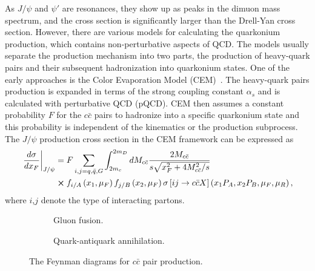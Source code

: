 \documentclass[../main.tex]{subfiles}
\begin{document}
As $J/\psi$ and $\psi'$ are resonances, they show up as peaks in the dimuon mass spectrum,
and the cross section is significantly larger than the Drell-Yan cross section.
However, there are various models for calculating the quarkonium production,
which contains non-perturbative aspects of QCD.
The models usually separate the production
mechanism into two parts, the production of heavy-quark pairs and their subsequent
hadronization into quarkonium states. One of the early approaches is the Color
Evaporation Model (CEM)~\cite{einhorn1975,bodwin1995}. The heavy-quark
pairs production is expanded in terms of the strong coupling constant $\alpha_s$
and is calculated with perturbative QCD (pQCD). CEM then assumes a constant
probability $F$ for the $c\bar{c}$ pairs to hadronize into a specific quarkonium
state and this probability is independent of the kinematics or the production
subprocess. The $J/\psi$ production cross section in the CEM framework can be
expressed as
\begin{equation}
	\begin{split}
		\left.\frac{d\sigma}{dx_F}\right|_{J/\psi} & = F \sum_{i,j = q,\bar{q},G}\int^{2m_D}_{2m_c} dM_{c\bar{c}}  \frac{2M_{c\bar{c}}}{s\sqrt{x_F^2+4M_{c\bar{c}}^2/s}}                                 \\
		                                           & \cross f_{i/A}\left(x_1,\mu_F\right)f_{j/B}\left(x_2,\mu_F\right)\sigma\left[ij\rightarrow c\bar{c}X\right]\left(x_1P_A,x_2P_B,\mu_F,\mu_R \right),
	\end{split}
\end{equation}
where $i$,$j$ denote the type of interacting partons.
\begin{figure}[htpb!]
	\centering
	\begin{subfigure}[c]{0.4\linewidth}
		\begin{subfigure}[c]{\linewidth}
			
		\end{subfigure}
		\begin{subfigure}[c]{\linewidth}
			
		\end{subfigure}
		\caption{Gluon fusion\label{subfig:gluon}.}
	\end{subfigure}
	\quad
	\begin{subfigure}[c]{0.4\linewidth}
		
		\caption{Quark-antiquark annihilation.\label{subfig:qqbar}}
	\end{subfigure}
	\caption{The Feynman diagrams for $c\bar{c}$ pair production.}
	\label{fig:charmonium}
\end{figure}
\end{document}

